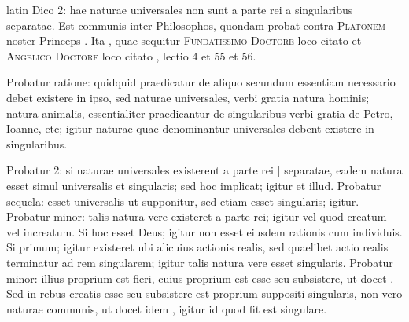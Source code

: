 \begin{otherlanguage*}{latin}
\pstart
 Dico 2: hae naturae universales non sunt a parte rei a singularibus separatae. Est communis inter Philosophos, quondam probat contra \textsc{Platonem} noster Princeps . Ita , quae sequitur \textsc{Fundatissimo Doctore}  loco citato et \textsc{Angelico Doctore}\index[persons]{} loco citato , lectio 4 et  55 et 56. 
\pend

\pstart
 Probatur ratione: quidquid praedicatur de aliquo secundum essentiam necessario debet existere in ipso, sed naturae universales, verbi gratia natura hominis; natura animalis, essentialiter praedicantur de singularibus verbi gratia de Petro, Ioanne, etc; igitur naturae quae denominantur universales debent existere in singularibus. 
\pend

\pstart
 Probatur 2: si naturae universales existerent a parte rei \textnormal{|}  separatae, eadem natura esset simul universalis et singularis; sed hoc implicat; igitur et illud. Probatur sequela: esset universalis ut supponitur, sed etiam esset singularis; igitur. Probatur minor: talis natura vere existeret a parte rei; igitur vel quod creatum vel increatum. Si hoc esset Deus; igitur non esset eiusdem rationis cum individuis. Si primum; igitur existeret ubi alicuius actionis realis, sed quaelibet actio realis terminatur ad rem singularem; igitur talis natura vere esset singularis. Probatur minor: illius proprium est fieri, cuius proprium est esse seu subsistere, ut docet . Sed in rebus creatis esse seu subsistere est proprium suppositi singularis, non vero naturae communis, ut docet idem , igitur id quod fit est singulare. 
\pend


\end{otherlanguage*}
